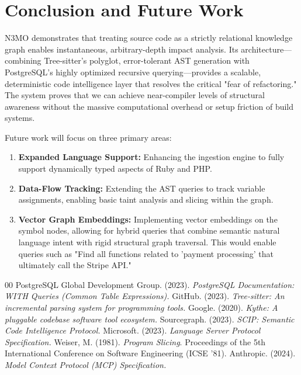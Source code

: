 \documentclass[conference]{IEEEtran}
\begin{document}
\section{Conclusion and Future Work}

N3MO demonstrates that treating source code as a strictly relational knowledge graph enables instantaneous, arbitrary-depth impact analysis. Its architecture—combining Tree-sitter's polyglot, error-tolerant AST generation with PostgreSQL's highly optimized recursive querying—provides a scalable, deterministic code intelligence layer that resolves the critical "fear of refactoring." The system proves that we can achieve near-compiler levels of structural awareness without the massive computational overhead or setup friction of build systems.

Future work will focus on three primary areas:
\begin{enumerate}
    \item \textbf{Expanded Language Support:} Enhancing the ingestion engine to fully support dynamically typed aspects of Ruby and PHP.
    \item \textbf{Data-Flow Tracking:} Extending the AST queries to track variable assignments, enabling basic taint analysis and slicing within the graph.
    \item \textbf{Vector Graph Embeddings:} Implementing vector embeddings on the symbol nodes, allowing for hybrid queries that combine semantic natural language intent with rigid structural graph traversal. This would enable queries such as "Find all functions related to 'payment processing' that ultimately call the Stripe API."
\end{enumerate}

\begin{thebibliography}{00}
 PostgreSQL Global Development Group. (2023). \textit{PostgreSQL Documentation: WITH Queries (Common Table Expressions).}
 GitHub. (2023). \textit{Tree-sitter: An incremental parsing system for programming tools.}
 Google. (2020). \textit{Kythe: A pluggable codebase software tool ecosystem.}
 Sourcegraph. (2023). \textit{SCIP: Semantic Code Intelligence Protocol.}
 Microsoft. (2023). \textit{Language Server Protocol Specification.}
 Weiser, M. (1981). \textit{Program Slicing}. Proceedings of the 5th International Conference on Software Engineering (ICSE '81).
 Anthropic. (2024). \textit{Model Context Protocol (MCP) Specification.}
\end{thebibliography}
\end{document}

